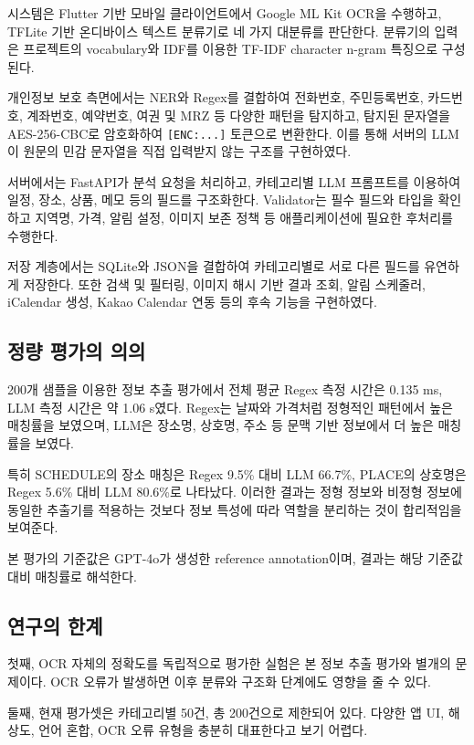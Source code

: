 \documentclass[11pt,a4paper]{article}
\begin{document}
시스템은 Flutter 기반 모바일 클라이언트\cite{ref_flutter}에서 Google ML Kit OCR\cite{ref_mlkit}을 수행하고, TFLite 기반 온디바이스 텍스트 분류기로 네 가지 대분류를 판단한다. 분류기의 입력은 프로젝트의 vocabulary와 IDF를 이용한 TF-IDF character n-gram 특징으로 구성된다.

개인정보 보호 측면에서는 NER와 Regex를 결합하여 전화번호, 주민등록번호, 카드번호, 계좌번호, 예약번호, 여권 및 MRZ 등 다양한 패턴을 탐지하고, 탐지된 문자열을 AES-256-CBC로 암호화하여 \texttt{[ENC:...]} 토큰으로 변환한다. 이를 통해 서버의 LLM이 원문의 민감 문자열을 직접 입력받지 않는 구조를 구현하였다.

서버에서는 FastAPI가 분석 요청을 처리하고, 카테고리별 LLM 프롬프트를 이용하여 일정, 장소, 상품, 메모 등의 필드를 구조화한다. Validator는 필수 필드와 타입을 확인하고 지역명, 가격, 알림 설정, 이미지 보존 정책 등 애플리케이션에 필요한 후처리를 수행한다.

저장 계층에서는 SQLite\cite{ref_sqlite}와 JSON을 결합하여 카테고리별로 서로 다른 필드를 유연하게 저장한다. 또한 검색 및 필터링, 이미지 해시 기반 결과 조회, 알림 스케줄러, iCalendar 생성, Kakao Calendar 연동 등의 후속 기능을 구현하였다.

\subsection{정량 평가의 의의}

200개 샘플을 이용한 정보 추출 평가에서 전체 평균 Regex 측정 시간은 0.135 ms, LLM 측정 시간은 약 1.06 s였다. Regex는 날짜와 가격처럼 정형적인 패턴에서 높은 매칭률을 보였으며, LLM은 장소명, 상호명, 주소 등 문맥 기반 정보에서 더 높은 매칭률을 보였다.

특히 SCHEDULE의 장소 매칭은 Regex 9.5\% 대비 LLM 66.7\%, PLACE의 상호명은 Regex 5.6\% 대비 LLM 80.6\%로 나타났다. 이러한 결과는 정형 정보와 비정형 정보에 동일한 추출기를 적용하는 것보다 정보 특성에 따라 역할을 분리하는 것이 합리적임을 보여준다.

본 평가의 기준값은 GPT-4o가 생성한 reference annotation이며, 결과는 해당 기준값 대비 매칭률로 해석한다.

\subsection{연구의 한계}

첫째, OCR 자체의 정확도를 독립적으로 평가한 실험은 본 정보 추출 평가와 별개의 문제이다. OCR 오류가 발생하면 이후 분류와 구조화 단계에도 영향을 줄 수 있다.

둘째, 현재 평가셋은 카테고리별 50건, 총 200건으로 제한되어 있다. 다양한 앱 UI, 해상도, 언어 혼합, OCR 오류 유형을 충분히 대표한다고 보기 어렵다.
\end{document}
